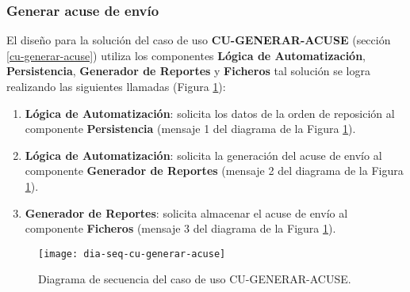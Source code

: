 \subsubsection{Generar acuse de envío}
El diseño para la solución del caso de uso \textbf{CU-GENERAR-ACUSE} (sección \ref{cu-generar-acuse}) utiliza los componentes \textbf{Lógica de Automatización}, \textbf{Persistencia}, \textbf{Generador de Reportes} y \textbf{Ficheros} tal solución se logra realizando las siguientes llamadas (Figura \ref{fig:dia-seq-cu-generar-acuse}):
\begin{enumerate}
	\item \textbf{Lógica de Automatización}: solicita los datos de la orden de reposición al componente \textbf{Persistencia} (mensaje 1 del diagrama de la Figura \ref{fig:dia-seq-cu-generar-acuse}).
	\item \textbf{Lógica de Automatización}: solicita la generación del acuse de envío al componente \textbf{Generador de Reportes} (mensaje 2 del diagrama de la Figura \ref{fig:dia-seq-cu-generar-acuse}).
	\item \textbf{Generador de Reportes}: solicita almacenar el acuse de envío al componente \textbf{Ficheros} (mensaje 3 del diagrama de la Figura \ref{fig:dia-seq-cu-generar-acuse}).
\end{enumerate}

\begin{figure}[h]
	\centering
	\texttt{[image: dia-seq-cu-generar-acuse]}
	\caption{Diagrama de secuencia del caso de uso CU-GENERAR-ACUSE.}
	\label{fig:dia-seq-cu-generar-acuse}
\end{figure}

\pagebreak


